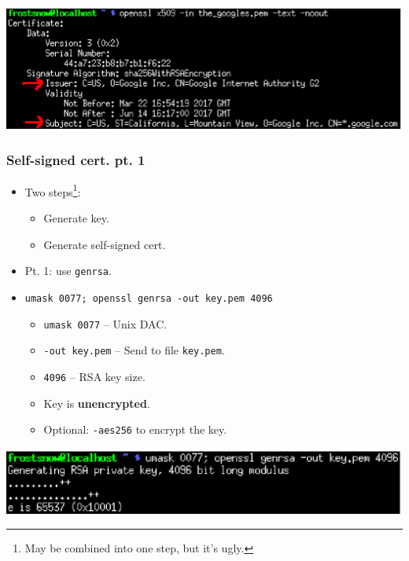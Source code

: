 \documentclass[xcolor={dvipsnames,svgnames},hyperref=dvips]{beamer}
\begin{document}
	\begin{frame}
		\center\includegraphics[scale=0.55]{textcertzoom.ps}
	\end{frame}

	\begin{frame}
		\frametitle{Self-signed cert. pt. 1}
		\begin{itemize}
			\item Two steps\footnote{May be combined into one step, but it's ugly.}:
			\begin{itemize}
				\item Generate key.
				\item Generate self-signed cert.
			\end{itemize}
			\item Pt. 1: use \texttt{genrsa}.
			\item \texttt{umask 0077; openssl genrsa -out key.pem 4096}
			\begin{itemize}
				\item \texttt{umask 0077} -- Unix DAC.
				\item \texttt{-out key.pem} -- Send to file \texttt{key.pem}.
				\item \texttt{4096} -- RSA key size.
				\item Key is \textbf{unencrypted}.
				\item Optional: \texttt{-aes256} to encrypt the key.
			\end{itemize}
		\end{itemize}
	\end{frame}
	\begin{frame}
		\center\includegraphics[scale=0.6]{genrsa.ps}
	\end{frame}
\end{document}
